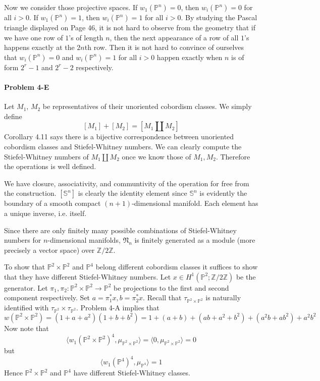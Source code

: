 \documentclass[12pt]{article}
\theoremstyle{plain}
\theoremstyle{definition}
\newcommand{\IP}{\mathbb{P}}
\newcommand{\IS}{\mathbb{S}}
\newcommand{\IZ}{\mathbb{Z}}
\newcommand{\<}{\langle}
\renewcommand{\>}{\rangle}
\newcommand{\fN}{\mathfrak{N}}
\begin{document}
Now we consider those projective spaces. If $w_1(\IP^n) = 0$, then $w_i(\IP^n) = 0$ for all $i > 0$. If $w_1(\IP^n) = 1$, then $w_i(\IP^n) = 1$ for all $i > 0$. By studying the Pascal triangle displayed on Page 46, it is not hard to observe from the geometry that if we have one row of $1$'s of length $n$, then the next appearance of a row of all $1$'s happens exactly at the $2n$th row. Then it is not hard to convince of ourselves that $w_i(\IP^n) = 0$ and $w_i(\IP^n) = 1$ for all $i > 0$ happen exactly when $n$ is of form $2^r - 1$ and $2^r - 2$ respectively.  

\paragraph{Problem 4-E} Let $M_1$, $M_2$ be representatives of their unoriented cobordism classes. We simply define 
$$ [M_1] + [M_2] = [ M_1 \coprod M_2 ]$$
Corollary 4.11 says there is a bijective correspondence between unoriented cobordism classes and Stiefel-Whitney numbers. We can clearly compute the Stiefel-Whitney numbers of $M_1 \coprod M_2$ once we know those of $M_1, M_2$. Therefore the operations is well defined. 

We have closure, associativity, and communtivity of the operation for free from the construction. $[\IS^n]$ is clearly the identity element since $\IS^n$ is evidently the boundary of a smooth compact $(n+1)$-dimensional manifold. Each element has a unique inverse, i.e. itself. 

Since there are only finitely many possible combinations of Stiefel-Whitney numbers for $n$-dimensional manifolds, $\fN_n$ is finitely generated as a module (more precisely a vector space) over $\IZ/2\IZ$. 

To show that $\IP^2 \times \IP^2$ and $\IP^4$ belong different cobordism classes it suffices to show that they have different Stiefel-Whitney numbers. Let $x \in H^1(\IP^2; \IZ/2\IZ)$ be the generator. Let $\pi_1, \pi_2 : \IP^2 \times \IP^2 \to \IP^2$ be projections to the first and second component respectively. Set $a = \pi_1^* x, b = \pi_2^* x$. Recall that $\tau_{\IP^2 \times \IP^2}$ is naturally identified with $\tau_{\IP^2} \times \tau_{\IP^2}
$. Problem 4-A implies that 
$$ w(\IP^2 \times \IP^2) = (1 + a + a^2)(1 + b + b^2) = 1 + (a + b) + (ab + a^2 + b^2 ) + (a^2 b + a b^2) + a^2 b^2$$
Now note that 
$$ \< w_1(\IP^2 \times \IP^2)^4, \mu_{\IP^2 \times \IP^2} \> = \< 0, \mu_{\IP^2 \times \IP^2} \> = 0$$
but 
$$ \< w_1(\IP^4)^4, \mu_{\IP^4} \> = 1 $$
Hence $\IP^2 \times \IP^2$ and $\IP^4$ have different Stiefel-Whitney classes. 
\end{document}
